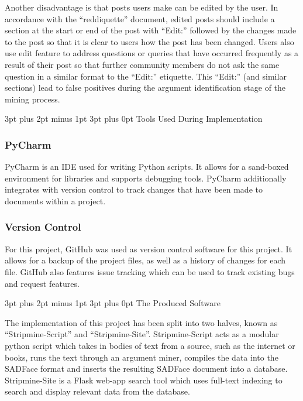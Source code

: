 \documentclass[12pt,a4paper]{article}
\makeatletter
\renewcommand\subsection{\@startsection {subsection}{1}{2mm} %
                               {3pt plus 2pt minus 1pt} %
                               {3pt plus 0pt} %
                               {\normalfont\bfseries}}
\makeatother
\begin{document}
Another disadvantage is that posts users make can be edited by the user. In accordance with the ``reddiquette'' document, edited posts should include a section at the start or end of the post with ``Edit:'' followed by the changes made to the post so that it is clear to users how the post has been changed. Users also use edit feature to address questions or queries that have occurred frequently as a result of their post so that further community members do not ask the same question in a similar format to the ``Edit:'' etiquette. This ``Edit:'' (and similar sections) lead to false positives during the argument identification stage of the mining process.

\subsection{Tools Used During Implementation}

\subsubsection{PyCharm}

PyCharm is an IDE used for writing Python scripts. It allows for a sand-boxed environment for libraries and supports debugging tools. PyCharm additionally integrates with version control to track changes that have been made to documents within a project. 

\subsubsection{Version Control}

For this project, GitHub was used as version control software for this project. It allows for a backup of the project files, as well as a history of changes for each file. GitHub also features issue tracking which can be used to track existing bugs and request features.

\subsection{The Produced Software}

The implementation of this project has been split into two halves, known as ``Stripmine-Script'' and ``Stripmine-Site''. Stripmine-Script acts as a modular python script which takes in bodies of text from a source, such as the internet or books, runs the text through an argument miner, compiles the data into the SADFace format and inserts the resulting SADFace document into a database. Stripmine-Site is a Flask web-app search tool which uses full-text indexing to search and display relevant data from the database.\newline
\end{document}
